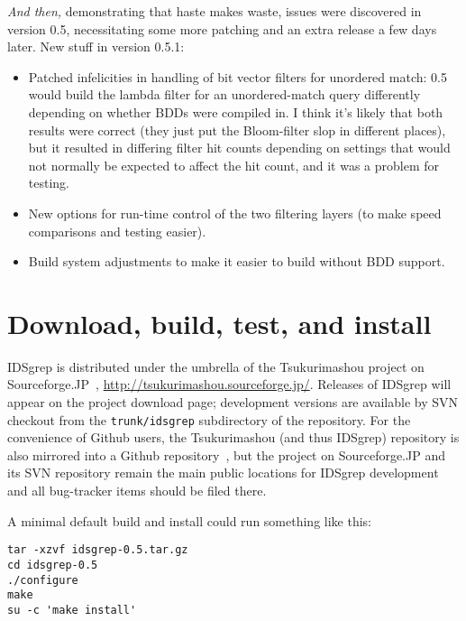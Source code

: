 \documentclass[twocolumn]{report}
\begin{document}
\emph{And then,} demonstrating that haste makes waste, issues
were discovered in version 0.5, necessitating some more patching and an
extra release a few days later.  New stuff in version 0.5.1:
\begin{itemize}
  \item Patched infelicities in handling of bit vector filters for
    unordered match:  0.5 would build the lambda filter for an
    unordered-match query differently depending on whether BDDs were
    compiled in.  I think it's likely that both results were
    correct (they just put the Bloom-filter slop in different places),
    but it resulted in differing filter hit counts depending on
    settings that would not normally be expected to affect the hit count,
    and it was a problem for testing.
  \item New options for run-time control of the two filtering layers (to
    make speed comparisons and testing easier).
  \item Build system adjustments to make it easier to build without BDD
    support.
\end{itemize}


\section{Download, build, test, and install}

IDSgrep is distributed under the umbrella of the Tsukurimashou project on
Sourceforge.JP~\cite{Tsukurimashou},
\url{http://tsukurimashou.sourceforge.jp/}.  Releases of IDSgrep
will appear on the project download page; development versions are available
by SVN checkout from the \texttt{trunk/idsgrep} subdirectory of the
repository.  For the convenience of Github users, the Tsukurimashou (and
thus IDSgrep) repository is also mirrored into a Github
repository~\cite{TsukuGithub}, but the project on Sourceforge.JP and its SVN
repository remain the main public locations for IDSgrep development and all
bug-tracker items should be filed there.

A minimal default build and install could run something like this:
\begin{verbatim}
tar -xzvf idsgrep-0.5.tar.gz
cd idsgrep-0.5
./configure
make
su -c 'make install'
\end{verbatim}
\end{document}
